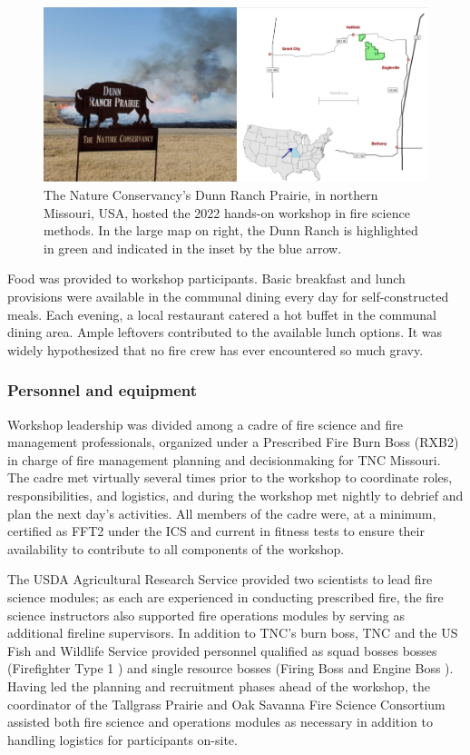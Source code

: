 \documentclass[fire,article,submit,moreauthors,pdftex]{Definitions/mdpi}
\begin{document}
\begin{figure}
\centering
\includegraphics[width=1\columnwidth]{DunnRanchMap.png}
\caption{The Nature Conservancy's Dunn Ranch Prairie, in northern Missouri, USA, hosted the 2022 hands-on workshop in fire science methods. In the large map on right, the Dunn Ranch is highlighted in green and indicated in the inset by the blue arrow.}
\label{DunnRanch}
\end{figure}

Food was provided to workshop participants.
Basic breakfast and lunch provisions were available in the communal dining every day for self-constructed meals.
Each evening, a local restaurant catered a hot buffet in the communal dining area.
Ample leftovers contributed to the available lunch options.
It was widely hypothesized that no fire crew has ever encountered so much gravy.

\subsubsection{Personnel and equipment}

Workshop leadership was divided among a cadre of fire science and fire management professionals, organized under a Prescribed Fire Burn Boss (RXB2) in charge of fire management planning and decisionmaking for TNC Missouri.
The cadre met virtually several times prior to the workshop to coordinate roles, responsibilities, and logistics, and during the workshop met nightly to debrief and plan the next day's activities.
All members of the cadre were, at a minimum, certified as FFT2 under the ICS and current in fitness tests to ensure their availability to contribute to all components of the workshop.

The USDA Agricultural Research Service provided two scientists to lead fire science modules; as each are experienced in conducting prescribed fire, the fire science instructors also supported fire operations modules by serving as additional fireline supervisors.
In addition to TNC's burn boss, TNC and the US Fish and Wildlife Service provided personnel qualified as squad bosses bosses (Firefighter Type 1 ) and single resource bosses (Firing Boss  and Engine Boss ).
Having led the planning and recruitment phases ahead of the workshop, the coordinator of the Tallgrass Prairie and Oak Savanna Fire Science Consortium assisted both fire science and operations modules as necessary in addition to handling logistics for participants on-site.
\end{document}
